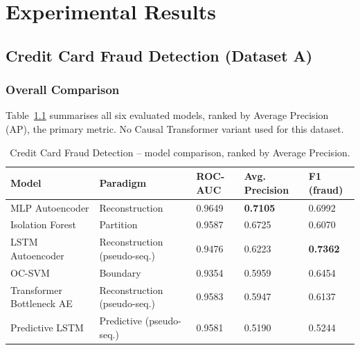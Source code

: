 \chapter{Experimental Results}
\label{ch:results}


\section{Credit Card Fraud Detection (Dataset A)}

\subsection{Overall Comparison}

Table~\ref{tab:cc-results} summarises all six evaluated models, ranked by Average Precision (AP), the primary metric. No Causal Transformer variant used for this dataset.

\begin{table}[h]
\centering
\begin{tabular}{@{}lllll@{}}
\toprule
Model & Paradigm & ROC-AUC & Avg. Precision & F1 (fraud) \\
\midrule
MLP Autoencoder            & Reconstruction              & 0.9649 & \textbf{0.7105} & 0.6992 \\
Isolation Forest           & Partition                   & 0.9587 & 0.6725          & 0.6070 \\
LSTM Autoencoder           & Reconstruction (pseudo-seq.) & 0.9476 & 0.6223          & \textbf{0.7362} \\
OC-SVM                     & Boundary                     & 0.9354 & 0.5959          & 0.6454 \\
Transformer Bottleneck AE  & Reconstruction (pseudo-seq.) & 0.9583 & 0.5947          & 0.6137 \\
Predictive LSTM            & Predictive (pseudo-seq.)     & 0.9581 & 0.5190          & 0.5244 \\
\bottomrule
\end{tabular}
\caption{Credit Card Fraud Detection -- model comparison, ranked by Average Precision.}
\label{tab:cc-results}
\end{table}

